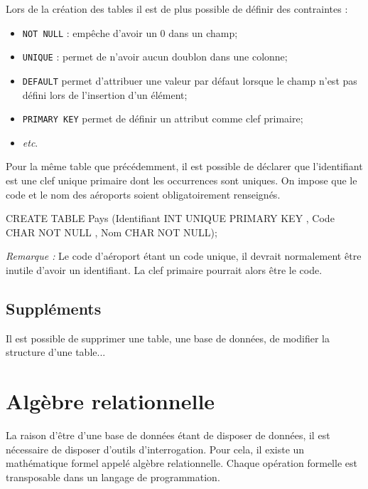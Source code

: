 \documentclass[10pt,fleqn]{article} %
\begin{document}
Lors de la création des tables il est de plus possible de définir des contraintes :
\begin{itemize}
\item \texttt{NOT NULL} : empêche d'avoir un 0 dans un champ;
\item \texttt{UNIQUE} : permet de n'avoir aucun doublon dans une colonne;
\item \texttt{DEFAULT} permet d'attribuer une valeur par défaut lorsque le champ n'est pas défini lors de l'insertion d'un élément;
\item \texttt{PRIMARY KEY} permet de définir un attribut comme clef primaire;
\item \textit{etc}.
\end{itemize}

\begin{exemple}
Pour la même table que précédemment, il est possible de déclarer que l'identifiant est une clef unique primaire dont les occurrences sont uniques. On impose que le code et le nom des aéroports soient obligatoirement renseignés.


\begin{envsql}
\begin{sql}
CREATE TABLE Pays (Identifiant INT UNIQUE PRIMARY KEY , Code CHAR NOT NULL , Nom CHAR NOT NULL);
\end{sql}
\end{envsql}
\textit{Remarque : } Le code d'aéroport étant un code unique, il devrait normalement être inutile d'avoir un identifiant. La clef primaire pourrait alors être le code. 

\end{exemple}

\subsection{Suppléments}
Il est possible de supprimer une table, une base de données, de modifier la structure d'une table...
\section{Algèbre relationnelle}
La raison d'être d'une base de données étant de disposer de données, il est nécessaire de disposer d'outils d'interrogation. Pour cela, il existe un mathématique formel appelé algèbre relationnelle. Chaque opération formelle est transposable dans un langage de programmation. 
\end{document}
